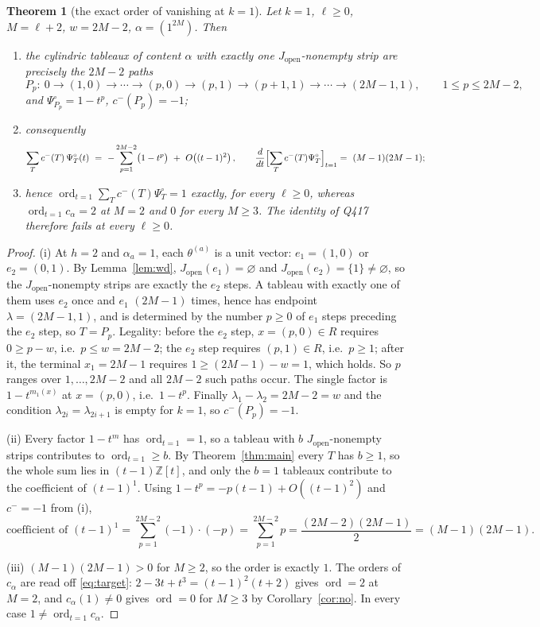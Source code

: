 \documentclass[11pt]{article}
\theoremstyle{plain}
\newtheorem{theorem}{Theorem}
\theoremstyle{definition}
\newcommand{\Jop}{J_{\mathrm{open}}}
\newcommand{\Psiop}{\Psi^{\circ}}
\newcommand{\ord}{\operatorname{ord}}
\begin{document}
\begin{theorem}[the exact order of vanishing at $k=1$]\label{thm:order}
Let $k=1$, $\ell\ge0$, $M=\ell+2$, $w=2M-2$, $\alpha=(1^{2M})$. Then
\begin{enumerate}[label=(\roman*),leftmargin=2.2em]
\item the cylindric tableaux of content $\alpha$ with \emph{exactly one} $\Jop$-nonempty strip
      are precisely the $2M-2$ paths
      \[
      P_p:\ 0\to(1,0)\to\cdots\to(p,0)\to(p,1)\to(p+1,1)\to\cdots\to(2M-1,1),
      \qquad 1\le p\le 2M-2,
      \]
      and $\Psiop_{P_p}=1-t^{p}$, $c^-(P_p)=-1$;
\item consequently
      \[
      \sum_T c^-(T)\,\Psiop_T(t)\ =\ -\sum_{p=1}^{2M-2}\bigl(1-t^{p}\bigr)\ +\ O\!\left((t-1)^2\right),
      \qquad
      \frac{d}{dt}\Bigl[\sum_T c^-(T)\Psiop_T\Bigr]_{t=1}=\ (M-1)(2M-1);
      \]
\item hence $\ord_{t=1}\sum_T c^-(T)\Psiop_T = 1$ \emph{exactly}, for every $\ell\ge0$, whereas
      $\ord_{t=1}c_\alpha = 2$ at $M=2$ and $0$ for every $M\ge3$. The identity of Q417
      therefore fails at every $\ell\ge0$.
\end{enumerate}
\end{theorem}

\begin{proof}
(i) At $h=2$ and $\alpha_a=1$, each $\theta^{(a)}$ is a unit vector: $e_1=(1,0)$ or $e_2=(0,1)$.
By Lemma~\ref{lem:wd}, $\Jop(e_1)=\varnothing$ and $\Jop(e_2)=\{1\}\ne\varnothing$, so the
$\Jop$-nonempty strips are exactly the $e_2$ steps. A tableau with exactly one of them uses
$e_2$ once and $e_1$ $(2M-1)$ times, hence has endpoint $\lambda=(2M-1,1)$, and is determined by
the number $p\ge0$ of $e_1$ steps preceding the $e_2$ step, so $T=P_p$. Legality: before the
$e_2$ step, $x=(p,0)\in R$ requires $0\ge p-w$, i.e.\ $p\le w=2M-2$; the $e_2$ step requires
$(p,1)\in R$, i.e.\ $p\ge1$; after it, the terminal $x_1=2M-1$ requires $1\ge(2M-1)-w=1$, which
holds. So $p$ ranges over $1,\dots,2M-2$ and all $2M-2$ such paths occur. The single factor is
$1-t^{m_1(x)}$ at $x=(p,0)$, i.e.\ $1-t^{p}$. Finally
$\lambda_1-\lambda_2=2M-2=w$ and the condition $\lambda_{2i}=\lambda_{2i+1}$ is empty for $k=1$,
so $c^-(P_p)=-1$.

(ii) Every factor $1-t^m$ has $\ord_{t=1}=1$, so a tableau with $b$ $\Jop$-nonempty strips
contributes to $\ord_{t=1}\ge b$. By Theorem~\ref{thm:main} every $T$ has $b\ge1$, so the whole
sum lies in $(t-1)\mathbb{Z}[t]$, and only the $b=1$ tableaux contribute to the coefficient of
$(t-1)^1$. Using $1-t^p=-p(t-1)+O((t-1)^2)$ and $c^-=-1$ from (i),
\[
\text{coefficient of }(t-1)^1
=\sum_{p=1}^{2M-2}(-1)\cdot(-p)=\sum_{p=1}^{2M-2}p=\frac{(2M-2)(2M-1)}{2}=(M-1)(2M-1).
\]

(iii) $(M-1)(2M-1)>0$ for $M\ge2$, so the order is exactly $1$. The orders of $c_\alpha$ are read
off \eqref{eq:target}: $2-3t+t^3=(t-1)^2(t+2)$ gives $\ord=2$ at $M=2$, and $c_\alpha(1)\ne0$
gives $\ord=0$ for $M\ge3$ by Corollary~\ref{cor:no}. In every case $1\ne\ord_{t=1}c_\alpha$.
\end{proof}
\end{document}
